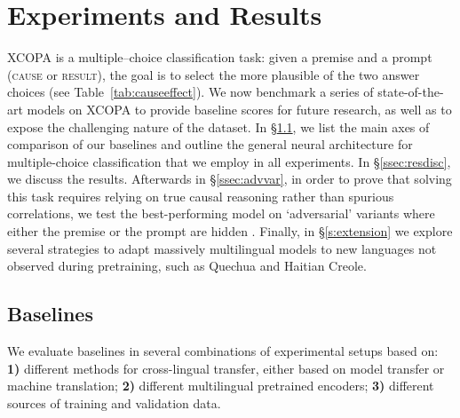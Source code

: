 \documentclass[11pt,a4paper]{article}
\begin{document}
 
\section{Experiments and Results}
\label{s:experiments}
XCOPA is a multiple--choice classification task: given a premise and a prompt (\textsc{cause} or \textsc{result}), the goal is to select the more plausible of the two answer choices (see Table~\ref{tab:causeeffect}). We now benchmark a series of state-of-the-art models on XCOPA to provide baseline scores for future research, as well as to expose the challenging nature of the dataset.  In \S\ref{ssec:mcclas}, we list the main axes of comparison of our baselines and outline the general neural architecture for multiple-choice classification that we employ in all experiments. In \S\ref{ssec:resdisc}, we discuss the results. Afterwards in \S\ref{ssec:advvar}, in order to prove that solving this task requires relying on true causal reasoning rather than spurious correlations, we test the best-performing model on `adversarial' variants where either the premise or the prompt are hidden \citep{niven-kao-2019-probing}. Finally, in \S\ref{s:extension} we explore several strategies to adapt massively multilingual models to new languages not observed during pretraining, such as Quechua and Haitian Creole.

\iffalse
Pretrained neural language encoders come in two main flavors: (a) in the feature-based paradigm, the encoder provides the fixed representation of an input text, which is then fed to the task-specific classifier: the parameters of the encoder do not change in downstream training \cite{peters2018deep,yang2019multilingual}; (b) in the more popular fine-tuning approach, the parameters of the encoder are fine-tuned together with the classifier parameters in the downstream training \cite{Devlin:2019bert,liu2019roberta,conneau2019unsupervised,clark2019electra}. For monolingual English downstream tasks with (reasonably) large training sets, fine-tuning has been shown to perform better than feature-based encoding. 
In our experiments on XCOPA (i.e., cross-lingual transfer for causal commonsense reasoning), instead, we require multilingual encoders and have only (1) a small English COPA training set consisting of only 400 instances and (2) an even smaller development set in each target language (encompassing mere 100 instances). 
\fi

\subsection{Baselines}
\label{ssec:mcclas}
We evaluate baselines in several combinations of experimental setups based on: \textbf{1)} different methods for cross-lingual transfer, either based on model transfer or machine translation; \textbf{2)} different multilingual pretrained encoders; \textbf{3)} different sources of training and validation data.
\end{document}

